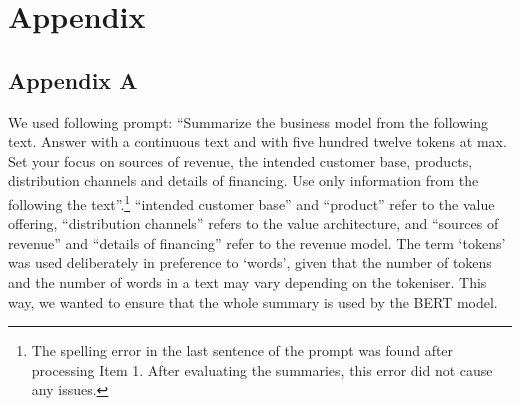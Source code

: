 \documentclass[
]{article}
\begin{document}
\newpage{}

\section{Appendix}\label{appendix}

\subsection{Appendix A}\label{appendix-a}

We used following prompt: ``Summarize the business model from the
following text. Answer with a continuous text and with five hundred
twelve tokens at max. Set your focus on sources of revenue, the intended
customer base, products, distribution channels and details of financing.
Use only information from the following the text''.\footnote{The
  spelling error in the last sentence of the prompt was found after
  processing Item 1. After evaluating the summaries, this error did not
  cause any issues.} ``intended customer base'' and ``product'' refer to
the value offering, ``distribution channels'' refers to the value
architecture, and ``sources of revenue'' and ``details of financing''
refer to the revenue model. The term `tokens' was used deliberately in
preference to `words', given that the number of tokens and the number of
words in a text may vary depending on the tokeniser. This way, we wanted
to ensure that the whole summary is used by the BERT model.

\begin{table}[H]
\centering
\caption{Descriptive Statistics of Number of Words of our Summaries}
\centering
{}
\end{table}
\end{document}

